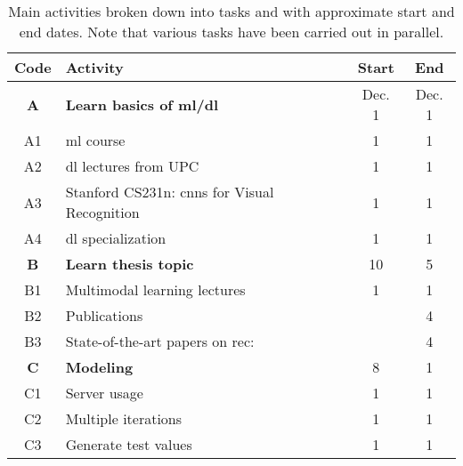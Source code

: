 \begin{table}[p]
  \centering
  \caption[Main activities broken down into tasks]{Main activities broken down
    into tasks and with approximate start and end dates. Note that various
    tasks have been carried out in parallel.}\label{tab:activities}
  \begin{tabular}{cp{}cc}
    \toprule
    \rowcolor{gray!37.5}
    \textbf{Code} & \textbf{Activity} & \textbf{Start} & \textbf{End} \\
    \midrule

    \rowcolor{rowColor}
    \textbf{A} & \textbf{Learn basics of \acs{ml}/\acs{dl}}                                      & Dec. 1 & Dec. 1 \\
    \rowcolor{rowColor}
    A1         & \Acs{ml} course \cite{ng20:machin_learn}                                        & 1      & 1      \\
    \rowcolor{rowColor}
    A2         & \Acs{dl} lectures from UPC \cite{giro-i-nieto20:all_deep_learn_upc_etset_telec} & 1      & 1      \\
    \rowcolor{rowColor}
    A3         & Stanford CS231n: \acsp{cnn} for Visual Recognition \cite{li20:cs231}            & 1      & 1      \\
    \rowcolor{rowColor}
    A4         & \Acs{dl} specialization \cite{ng20:deep_learn_special}                          & 1      & 1      \\
    \midrule

    \textbf{B} & \textbf{Learn thesis topic}                                                       & 10 & 5 \\
    B1         & Multimodal learning lectures \cite{giro-i-nieto20:all_deep_learn_upc_etset_telec} & 1  & 1 \\
    B2         & Publications                                                                      &    & 4 \\
    B3         & State-of-the-art papers on \acs{rec}: \cite{}                                     &    & 4 \\
    \midrule

    \rowcolor{rowColor}
    \textbf{C} & \textbf{Modeling}    & 8 & 1 \\
    \rowcolor{rowColor}
    C1         & Server usage         & 1 & 1 \\
    \rowcolor{rowColor}
    C2         & Multiple iterations  & 1 & 1 \\
    \rowcolor{rowColor}
    C3         & Generate test values & 1 & 1 \\
    \midrule


\end{tabular}
\end{table}
